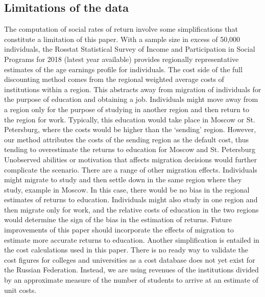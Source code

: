 \documentclass[alpha-refs]{wiley-article-05g}
\begin{document}
\subsection{Limitations of the data} 

The computation of social rates of return involve some simplifications that 
constitute a limitation of this paper. With a sample size in excess of 
50,000 individuals, the Rosstat Statistical Survey of Income and 
Participation in Social Programs for 2018 (latest year available) provides 
regionally representative estimates of the age earnings profile for 
individuals. The cost side of the full discounting method comes from the 
regional weighted average costs of institutions within a region. This 
abstracts away from migration of individuals for the purpose of education 
and obtaining a job. Individuals might move away from a region only for the 
purpose of studying in another region and then return to the region for 
work. Typically, this education would take place in Moscow or St. 
Petersburg, where the costs would be higher than the `sending' region. 
However, our method attributes the costs of the sending region as the 
default cost, thus tending to overestimate the returns to education for 
Moscow and St. Petersburg Unobserved abilities or motivation that affects 
migration decisions would further complicate the scenario. There are a 
range of other migration effects. Individuals might migrate to study and 
then settle down in the same region where they study, example in Moscow. In 
this case, there would be no bias in the regional estimates of returns to 
education. Individuals might also study in one region and then migrate only 
for work, and the relative costs of education in the two regions would 
determine the sign of the bias in the estimation of returns.  Future 
improvements of this paper should incorporate the effects of migration to 
estimate more accurate returns to education. 
Another simplification is entailed in the cost calculations used in this paper. There is no ready way to validate the cost figures for colleges and universities as a cost database does not yet exist for the Russian Federation. Instead, we are using revenues of the institutions divided by an approximate measure of the number of students to arrive at an estimate of unit costs. 

\vspace{-0.5em}
\end{document}
